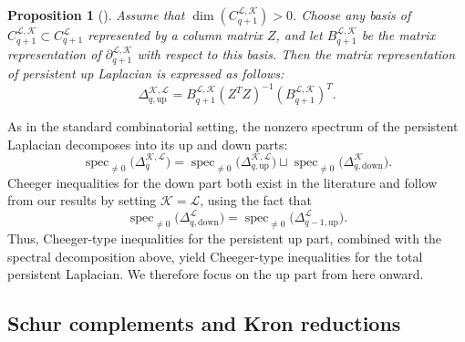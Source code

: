 \documentclass{article}
\newtheorem{proposition}{Proposition}[section]
\newcommand{\KK}{\mathcal{K}}
\newcommand{\LL}{\mathcal{L}}
\DeclareMathOperator*{\spec}{spec}
\begin{document}
\begin{proposition}[{\cite[Theorem 3.1.]{pers_lap}}]\label{prop:pers_up_lap}
Assume that $\dim(C_{q+1}^{\LL, \KK})>0$.
Choose any basis of $C_{q+1}^{\LL, \KK}\subset C_{q+1}^{\LL}$ represented by a column matrix $Z$, 
and let $B_{q+1}^{\LL, \KK}$ be the matrix representation of $\partial_{q+1}^{\LL, \KK}$ with respect to this basis.
Then the matrix representation of persistent up Laplacian is expressed as follows:
\begin{equation}\label{eq:pers_up_lap}
\Delta_{q, \mathrm{up}}^{\KK, \LL}
=
B_{q+1}^{\LL, \KK}(Z^TZ)^{-1}(B_{q+1}^{\LL, \KK})^T.
\end{equation}
\end{proposition}

As in the standard combinatorial setting, the nonzero spectrum of the persistent Laplacian decomposes into its up and down parts:
\[
\spec_{\neq 0}\bigl(\Delta_q^{\KK,\LL}\bigr)
=
\spec_{\neq 0}\bigl(\Delta_{q,\mathrm{up}}^{\KK,\LL}\bigr)
\sqcup
\spec_{\neq 0}\bigl(\Delta_{q,\mathrm{down}}^\KK\bigr).
\]
Cheeger inequalities for the down part both exist in the literature and follow from our results by setting \(\KK=\LL\), using the fact that
\[
\spec_{\neq 0}\bigl(\Delta_{q,\mathrm{down}}^\LL\bigr)
=
\spec_{\neq 0}\bigl(\Delta_{q-1,\mathrm{up}}^\LL\bigr).
\]
Thus, Cheeger-type inequalities for the persistent up part, combined with the spectral decomposition above, yield Cheeger-type inequalities for the total persistent Laplacian. We therefore focus on the up part from here onward.

\subsection{Schur complements and Kron reductions}
\label{subsec.schur}
\end{document}
